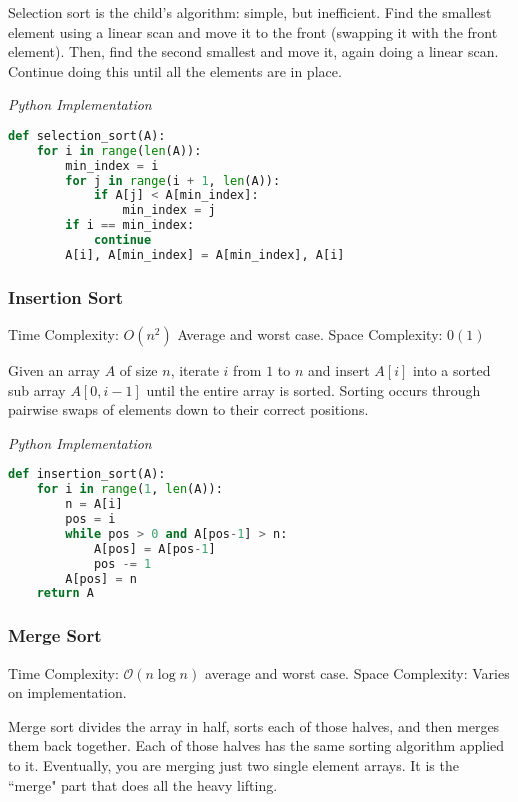 \documentclass{article}
\newcommand{\bigO}{\ensuremath{\mathcal{O}}}
\begin{document}
    Selection sort is the child's algorithm: simple, but inefficient. Find the smallest element using a linear scan and move it to the front (swapping it with the front element). Then, find the second smallest and move it, again doing a linear scan. Continue doing this until all the elements are in place. 

\vspace{8pt} \emph{Python Implementation}
\begin{lstlisting}[language=Python]
def selection_sort(A):
    for i in range(len(A)):
        min_index = i
        for j in range(i + 1, len(A)):
            if A[j] < A[min_index]:
                min_index = j
        if i == min_index:
            continue
        A[i], A[min_index] = A[min_index], A[i]
\end{lstlisting}
    
    \subsubsection{Insertion Sort}
    Time Complexity: $O(n^2)$ Average and worst case. Space Complexity: $0 (1)$
    
    Given an array $A$ of size $n$, iterate $i$ from $1$ to $n$ and insert $A[i]$ into a sorted sub array $A[0, i-1]$ until the entire array is sorted. Sorting occurs through pairwise swaps of elements down to their correct positions.

\vspace{8pt} \emph{Python Implementation}
\begin{lstlisting}[language=Python]
def insertion_sort(A):
    for i in range(1, len(A)):
        n = A[i]
        pos = i
        while pos > 0 and A[pos-1] > n:
            A[pos] = A[pos-1]
            pos -= 1
        A[pos] = n
    return A
\end{lstlisting}

    \subsubsection{Merge Sort}
    Time Complexity: $\bigO( n \log n )$ average and worst case. Space Complexity: Varies on implementation. 
    
    Merge sort divides the array in half, sorts each of those halves, and then merges them back together. Each of those halves has the same sorting algorithm applied to it. Eventually, you are merging just two single element arrays. It is the ``merge" part that does all the heavy lifting.
    
\end{document}
